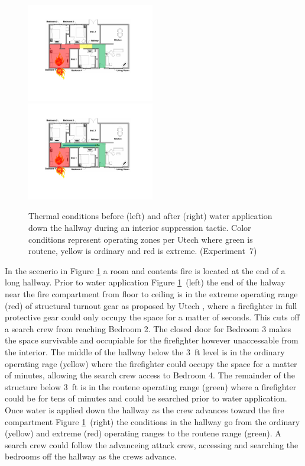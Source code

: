 \documentclass[12pt,oneside]{book}
\begin{document}
\begin{figure}[H]
\centering
\includegraphics[width=0.495\textwidth]{../0_Images/Tactical_Considerations/Similtanious_Search/Interior_Pre}
\includegraphics[width=0.495\textwidth]{../0_Images/Tactical_Considerations/Similtanious_Search/Interior_Post}
\caption[Thermal Conditions - Similatnious Search - Interior]{Thermal conditions before (left) and after (right) water application down the hallway during an interior suppression tactic. Color conditions represent operating zones per Utech \cite{Utech_Firefighter_Clothing} where green is routene, yellow is ordinary and red is extreme. (Experiment~7)}
\label{fig:similatnious_search_tc_interior}
\end{figure}

In the scenerio in Figure \ref{fig:similatnious_search_tc_interior} a room and contents fire is located at the end of a long hallway. Prior to water application Figure \ref{fig:similatnious_search_tc_interior}~(left) the end of the halway near the fire compartment from floor to ceiling is in the extreme operating range (red) of structural turnout gear as proposed by Utech \cite{Utech_Firefighter_Clothing}, where a firefighter in full protective gear could only occupy the space for a matter of seconds. This cuts off a search crew from reaching Bedroom 2. The closed door for Bedroom 3 makes the space survivable and occupiable for the firefighter however unaccessable from the interior. The middle of the hallway below the 3~ft level is in the ordinary operating rage (yellow) where the firefighter could occupy the space for a matter of minutes, allowing the search crew access to Bedroom 4. The remainder of the structure below 3~ft is in the routene operating range (green) where a firefighter could be for tens of minutes and could be searched prior to water application. Once water is applied down the hallway as the crew advances toward the fire compartment Figure \ref{fig:similatnious_search_tc_interior}~(right) the conditions in the hallway go from the ordinary (yellow) and extreme (red)  operating ranges to the routene range (green). A search crew could follow the advanceing attack crew, accessing and searching the bedrooms off the hallway as the crews advance. 
\end{document}
